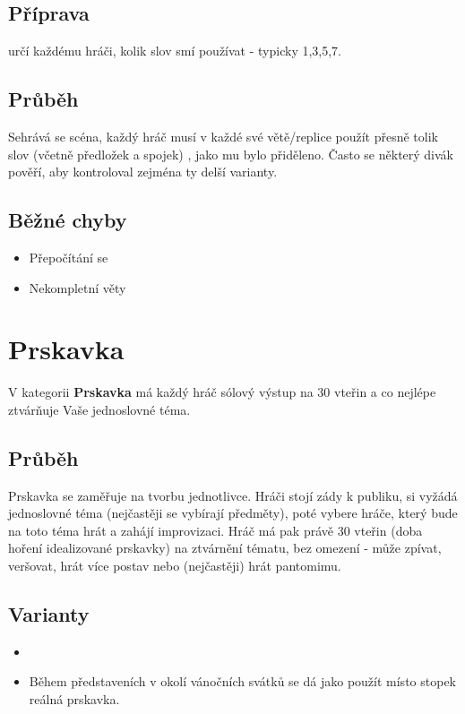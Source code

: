 \documentclass[main.tex]{subfiles}
\begin{document}
\subsection{Příprava}  určí každému hráči, kolik slov smí používat - typicky 1,3,5,7.  
 
\subsection{Průběh} Sehrává se scéna, každý hráč musí v každé své větě/replice použít přesně tolik slov (včetně předložek a spojek) , jako mu bylo přiděleno. 
Často se některý divák pověří, aby kontroloval zejména ty delší varianty. 
 
 
\subsection{ Běžné chyby } \begin{itemize}
\item  Přepočítání se
\item  Nekompletní věty
\end{itemize}
 
 
 
\needspace{5cm} \section{Prskavka} \label{prskavka}  
V kategorii \textbf{Prskavka}{} má každý hráč sólový výstup na 30 vteřin a co nejlépe ztvárňuje Vaše jednoslovné téma. 
 
\subsection{Průběh} Prskavka se zaměřuje na tvorbu jednotlivce. 
Hráči stojí zády k publiku,  si vyžádá jednoslovné téma (nejčastěji se vybírají předměty), poté vybere hráče, který bude na toto téma hrát a zahájí improvizaci. Hráč má pak právě 30 vteřin (doba hoření idealizované prskavky) na ztvárnění tématu, bez omezení - může zpívat, veršovat, hrát více postav nebo (nejčastěji) hrát pantomimu. 
 
\subsection{ Varianty } \begin{itemize}
\item {}
\item Během představeních v okolí vánočních svátků se dá jako  použít místo stopek reálná prskavka.
\end{itemize}
 
\end{document}
